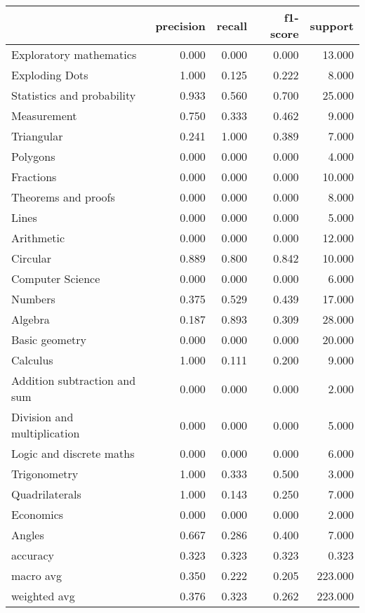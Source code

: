 \begin{tabular}{lrrrr}
\toprule
{} &  precision &  recall &  f1-score &  support \\
\midrule
Exploratory mathematics      &      0.000 &   0.000 &     0.000 &   13.000 \\
Exploding Dots               &      1.000 &   0.125 &     0.222 &    8.000 \\
Statistics and probability   &      0.933 &   0.560 &     0.700 &   25.000 \\
Measurement                  &      0.750 &   0.333 &     0.462 &    9.000 \\
Triangular                   &      0.241 &   1.000 &     0.389 &    7.000 \\
Polygons                     &      0.000 &   0.000 &     0.000 &    4.000 \\
Fractions                    &      0.000 &   0.000 &     0.000 &   10.000 \\
Theorems and proofs          &      0.000 &   0.000 &     0.000 &    8.000 \\
Lines                        &      0.000 &   0.000 &     0.000 &    5.000 \\
Arithmetic                   &      0.000 &   0.000 &     0.000 &   12.000 \\
Circular                     &      0.889 &   0.800 &     0.842 &   10.000 \\
Computer Science             &      0.000 &   0.000 &     0.000 &    6.000 \\
Numbers                      &      0.375 &   0.529 &     0.439 &   17.000 \\
Algebra                      &      0.187 &   0.893 &     0.309 &   28.000 \\
Basic geometry               &      0.000 &   0.000 &     0.000 &   20.000 \\
Calculus                     &      1.000 &   0.111 &     0.200 &    9.000 \\
Addition subtraction and sum &      0.000 &   0.000 &     0.000 &    2.000 \\
Division and multiplication  &      0.000 &   0.000 &     0.000 &    5.000 \\
Logic and discrete maths     &      0.000 &   0.000 &     0.000 &    6.000 \\
Trigonometry                 &      1.000 &   0.333 &     0.500 &    3.000 \\
Quadrilaterals               &      1.000 &   0.143 &     0.250 &    7.000 \\
Economics                    &      0.000 &   0.000 &     0.000 &    2.000 \\
Angles                       &      0.667 &   0.286 &     0.400 &    7.000 \\
accuracy                     &      0.323 &   0.323 &     0.323 &    0.323 \\
macro avg                    &      0.350 &   0.222 &     0.205 &  223.000 \\
weighted avg                 &      0.376 &   0.323 &     0.262 &  223.000 \\
\bottomrule
\end{tabular}

